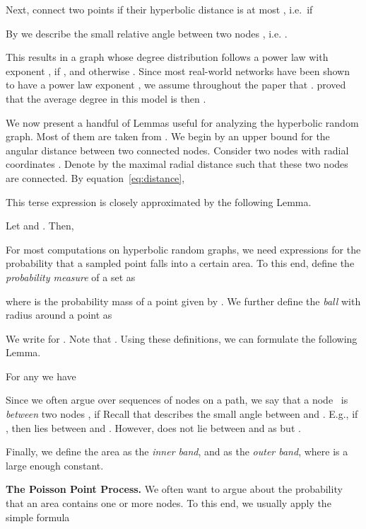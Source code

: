 \documentclass{llncs}
\newcommand{\eq}[1]{equation~\eqref{eq:#1}}
\begin{document}
Next, connect two points  if their hyperbolic distance is at most , i.e.\ if

By  we describe the small relative angle between two nodes , i.e. . 

This results in a graph whose degree distribution follows a power law with exponent , if , and  otherwise \cite{gugelmann2012random}. Since most real-world networks have been shown to have a power law exponent , we assume throughout the paper that . \citet{gugelmann2012random} proved that the average degree in this model is then .

We now present a handful of Lemmas useful for analyzing the hyperbolic random graph. Most of them are taken from \cite{gugelmann2012random}. We begin by an upper bound for the angular distance between two connected nodes. Consider two nodes with radial coordinates . Denote by  the maximal radial distance such that these two nodes are connected. By \eq{distance}, 

This terse expression is closely approximated by the following Lemma.
\begin{lemma}
\label{lem:maxangle}
Let  and . Then,

\end{lemma} 
For most computations on hyperbolic random graphs, we need expressions for the probability that a sampled point falls into a certain area. To this end, \citet{gugelmann2012random} define the {\em probability measure} of a set  as

where  is the probability mass of a point  given by .
We further define the {\em ball} with radius  around a point  as

We write  for . Note that . Using these definitions, we can formulate the following Lemma.
\begin{lemma}
\label{lem:intersection}
For any  we have

\end{lemma}
Since we often argue over sequences of nodes on a path, we say that a node~ is {\em between} two nodes , if  
Recall that  describes the small angle between  and . E.g., if , then  lies between  and . However,  does not lie between  and  as  but .

Finally, we define the area  as the {\em inner band}, and  as the {\em outer band}, where  is a large enough constant. 


\medskip \noindent \textbf{The Poisson Point Process.}
We often want to argue about the probability that an area  contains one or more nodes. To this end, we usually apply the simple formula
\end{document}
